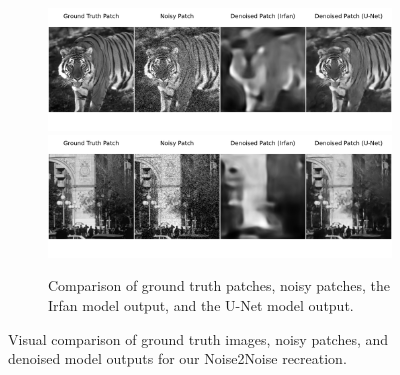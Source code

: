 \begin{figure}[p]
    \begin{subfigure}{\textwidth}
        \centering
        \includegraphics[trim={0 1cm 0 0},clip,width=\textwidth]{img/ch6/n2n_imagenet/irfan_vs_unet_1.pdf}
        \includegraphics[trim={0 1cm 0 2cm},clip,width=\textwidth]{img/ch6/n2n_imagenet/irfan_vs_unet_2.pdf}
        \caption{Comparison of ground truth patches, noisy patches, the Irfan model output, and the U-Net model output.}
        \label{fig:n2n-recreation-comparison}
    \end{subfigure}
    \caption{Visual comparison of ground truth images, noisy patches, and denoised model outputs for our Noise2Noise recreation.}
    \label{fig:n2n-recreation}
\end{figure}

